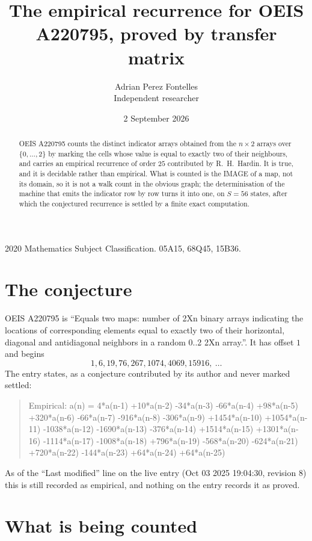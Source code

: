 \documentclass[11pt,a4paper]{article}
\title{The empirical recurrence for OEIS A220795, proved by transfer matrix}
\author{Adrian Perez Fontelles\\ \small Independent researcher}
\date{2 September 2026}
\theoremstyle{plain}
\theoremstyle{definition}
\begin{document}
\maketitle

\begin{abstract}
OEIS A220795 counts the distinct indicator arrays obtained from the $n\times2$ arrays over
$\{0,\dots,2\}$ by marking the cells whose value is equal to exactly two of their neighbours, and carries an
empirical recurrence of order $25$ contributed by R.~H.~Hardin. It is true, and it is
decidable rather than empirical. What is counted is the IMAGE of a map, not its domain, so it
is not a walk count in the obvious graph; the determinisation of the machine that emits the
indicator row by row turns it into one, on $S=56$ states, after which the conjectured
recurrence is settled by a finite exact computation.
\end{abstract}

\noindent\small 2020 Mathematics Subject Classification. 05A15, 68Q45, 15B36.\normalsize

\section{The conjecture}

OEIS A220795 is ``Equals two maps: number of 2Xn binary arrays indicating the locations of corresponding elements equal to exactly two of their horizontal, diagonal and antidiagonal neighbors in a random 0..2 2Xn array.''. It has offset $1$ and begins
\[
1, 6, 19, 76, 267, 1074, 4069, 15916,\ \dots
\]
The entry states, as a conjecture contributed by its author and never marked settled:
\begin{quote}
Empirical: a(n) = 4*a(n-1) +10*a(n-2) -34*a(n-3) -66*a(n-4) +98*a(n-5) +320*a(n-6) -66*a(n-7) -916*a(n-8) -306*a(n-9) +1454*a(n-10) +1054*a(n-11) -1038*a(n-12) -1690*a(n-13) -376*a(n-14) +1514*a(n-15) +1301*a(n-16) -1114*a(n-17) -1008*a(n-18) +796*a(n-19) -568*a(n-20) -624*a(n-21) +720*a(n-22) -144*a(n-23) +64*a(n-24) +64*a(n-25)
\end{quote}
As of the ``Last modified'' line on the live entry (Oct 03 2025 19:04:30, revision 8) this is still
recorded as empirical, and nothing on the entry records it as proved.

\section{What is being counted}
\end{document}
